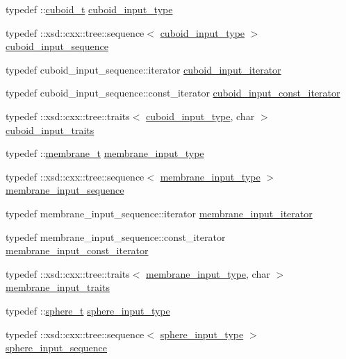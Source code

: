 \begin{DoxyCompactItemize}
typedef \+::\hyperlink{classcuboid__t}{cuboid\+\_\+t} \hyperlink{classinput__t_ab3172aa59d0cc9b2d4c5380d9cec72c3}{cuboid\+\_\+input\+\_\+type}
\item 
typedef \+::xsd\+::cxx\+::tree\+::sequence$<$ \hyperlink{classinput__t_ab3172aa59d0cc9b2d4c5380d9cec72c3}{cuboid\+\_\+input\+\_\+type} $>$ \hyperlink{classinput__t_a5aef33216e01e60c197cea604a519ab4}{cuboid\+\_\+input\+\_\+sequence}
\item 
typedef cuboid\+\_\+input\+\_\+sequence\+::iterator \hyperlink{classinput__t_aa4ecd719f9c1e557f73c163c723259f2}{cuboid\+\_\+input\+\_\+iterator}
\item 
typedef cuboid\+\_\+input\+\_\+sequence\+::const\+\_\+iterator \hyperlink{classinput__t_aab1823936b590269cb0f4de2f0a0a4fa}{cuboid\+\_\+input\+\_\+const\+\_\+iterator}
\item 
typedef \+::xsd\+::cxx\+::tree\+::traits$<$ \hyperlink{classinput__t_ab3172aa59d0cc9b2d4c5380d9cec72c3}{cuboid\+\_\+input\+\_\+type}, char $>$ \hyperlink{classinput__t_a6d747b3e200566247dcf36dd80109730}{cuboid\+\_\+input\+\_\+traits}
\item 
typedef \+::\hyperlink{classmembrane__t}{membrane\+\_\+t} \hyperlink{classinput__t_aa72abd8e01641f20e6fdb3d5d0bf99ca}{membrane\+\_\+input\+\_\+type}
\item 
typedef \+::xsd\+::cxx\+::tree\+::sequence$<$ \hyperlink{classinput__t_aa72abd8e01641f20e6fdb3d5d0bf99ca}{membrane\+\_\+input\+\_\+type} $>$ \hyperlink{classinput__t_a455e36bc8b009abdbd13c6d167864cfe}{membrane\+\_\+input\+\_\+sequence}
\item 
typedef membrane\+\_\+input\+\_\+sequence\+::iterator \hyperlink{classinput__t_a2a9ad5a60f532541071c8432e3f3333b}{membrane\+\_\+input\+\_\+iterator}
\item 
typedef membrane\+\_\+input\+\_\+sequence\+::const\+\_\+iterator \hyperlink{classinput__t_ad9f1a19dff09cac44dc94fd97b3ab778}{membrane\+\_\+input\+\_\+const\+\_\+iterator}
\item 
typedef \+::xsd\+::cxx\+::tree\+::traits$<$ \hyperlink{classinput__t_aa72abd8e01641f20e6fdb3d5d0bf99ca}{membrane\+\_\+input\+\_\+type}, char $>$ \hyperlink{classinput__t_a7d8560c1644f93d6491d5aad368aeddb}{membrane\+\_\+input\+\_\+traits}
\item 
typedef \+::\hyperlink{classsphere__t}{sphere\+\_\+t} \hyperlink{classinput__t_a75628386280268669a4cc94066bd8547}{sphere\+\_\+input\+\_\+type}
\item 
typedef \+::xsd\+::cxx\+::tree\+::sequence$<$ \hyperlink{classinput__t_a75628386280268669a4cc94066bd8547}{sphere\+\_\+input\+\_\+type} $>$ \hyperlink{classinput__t_aa968afe5c55f7cc3031e6196adddcae5}{sphere\+\_\+input\+\_\+sequence}

\end{DoxyCompactItemize}
